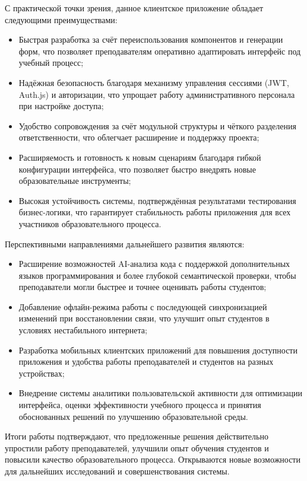 С практической точки зрения, данное клиентское приложение обладает следующими преимуществами:
\begin{itemize}
  \item Быстрая разработка за счёт переиспользования компонентов и генерации форм, что позволяет преподавателям оперативно адаптировать интерфейс под учебный процесс;
  \item Надёжная безопасность благодаря механизму управления сессиями (JWT, Auth.js) и авторизации, что упрощает работу административного персонала при настройке доступа;
  \item Удобство сопровождения за счёт модульной структуры и чёткого разделения ответственности, что облегчает расширение и поддержку проекта;
  \item Расширяемость и готовность к новым сценариям благодаря гибкой конфигурации интерфейса, что позволяет быстро внедрять новые образовательные инструменты;
  \item Высокая устойчивость системы, подтверждённая результатами тестирования бизнес-логики, что гарантирует стабильность работы приложения для всех участников образовательного процесса.
\end{itemize}

Перспективными направлениями дальнейшего развития являются:
\begin{itemize}
  \item Расширение возможностей AI-анализа кода с поддержкой дополнительных языков программирования и более глубокой семантической проверки, чтобы преподаватели могли быстрее и точнее оценивать работы студентов;
  \item Добавление офлайн-режима работы с последующей синхронизацией изменений при восстановлении связи, что улучшит опыт студентов в условиях нестабильного интернета;
  \item Разработка мобильных клиентских приложений для повышения доступности приложения и удобства работы преподавателей и студентов на разных устройствах;
  \item Внедрение системы аналитики пользовательской активности для оптимизации интерфейса, оценки эффективности учебного процесса и принятия обоснованных решений по улучшению образовательной среды.
\end{itemize}

Итоги работы подтверждают, что предложенные решения действительно упростили работу преподавателей, улучшили опыт обучения студентов и повысили качество образовательного процесса. Открываются новые возможности для дальнейших исследований и совершенствования системы.
